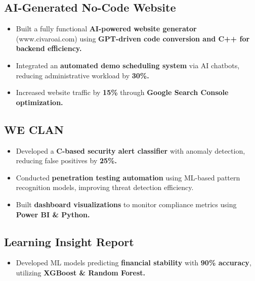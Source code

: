 \documentclass[a4paper,hidelinks]{deedy-resume} %
\begin{document}
\begin{minipage}[t]{0.66\textwidth}
\begin{itemize}
\end{itemize}

\subsection{AI-Generated No-Code Website}
\begin{itemize}
    \item Built a fully functional \textbf{AI-powered website generator} (www.civaroai.com) using \textbf{GPT-driven code conversion and C++ for backend efficiency.}
    \item Integrated an \textbf{automated demo scheduling system} via AI chatbots, reducing administrative workload by \textbf{30\%.}

    \item Increased website traffic by \textbf{15\%} through \textbf{Google Search Console optimization.}

\end{itemize}

\subsection{WE CLAN}
\begin{itemize}
    
    \item Developed a \textbf{C-based security alert classifier} with anomaly detection, reducing false positives by \textbf{25\%.}

    \item Conducted \textbf{penetration testing automation} using ML-based pattern recognition models, improving threat detection efficiency.

    \item Built \textbf{dashboard visualizations} to monitor compliance metrics using \textbf{Power BI \& Python.}

\end{itemize}

\subsection{Learning Insight Report}
\begin{itemize}
    \item Developed ML models predicting \textbf{financial stability} with \textbf{90\% accuracy}, utilizing \textbf{XGBoost \& Random Forest.}


\end{itemize}
\end{minipage}
\end{document}
